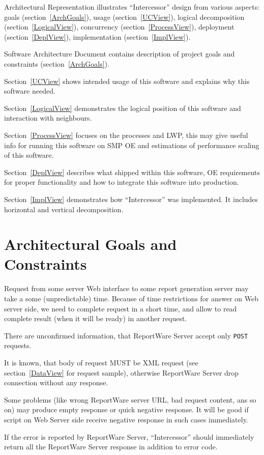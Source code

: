 \documentclass[a4paper,twoside]{article}
\newcommand{\Inter}{{\fontseries{b}\selectfont ``Intercessor''}}
\begin{document}
Architectural Representation illustrates \Inter{} design from various aspects:
goals (section~\ref{ArchGoals}), usage (section~\ref{UCView}), logical decomposition (section~\ref{LogicalView}),
concurrency (section~\ref{ProcessView}), deployment (section~\ref{DeplView}), implementation (section~\ref{ImplView}).

Software Architecture Document contains description of project goals and constraints (section~\ref{ArchGoals}).

Section~\ref{UCView} shows intended usage of this software and explains why this software
needed.

Section~\ref{LogicalView} demonstrates the logical position of this software and
interaction with neighbours.

Section~\ref{ProcessView} focuses on the processes and LWP, this may give useful info for running
this software on SMP OE and estimations of performance scaling of this software.

Section~\ref{DeplView} describes what shipped within this software, OE requirements
for proper functionality and how to integrate this software into production.

Section~\ref{ImplView} demonstrates how \Inter{} was implemented. It includes horizontal
and vertical decomposition.

\section{Architectural Goals and Constraints\label{ArchGoals}}

Request from some server Web interface to some report generation server
may take a some (unpredictable) time. Because of time restrictions for answer
on Web server side, we need to complete request in a short time, and allow
to read complete result (when it will be ready) in another request.

There are unconfirmed information, that ReportWare Server accept only \verb|POST| requests.

It is known, that body of request MUST be XML request (see section~\ref{DataView} for
request sample), otherwise ReportWare Server drop connection without any response.

Some problems (like wrong ReportWare server URL, bad request content, ans so on) may produce empty response or quick negative response.
It will be good if script on Web Server side receive negative response in such
cases immediately.

If the error is reported by ReportWare Server, \Inter{} should immediately return
all the ReportWare Server response in addition to error code.
 
\end{document}
